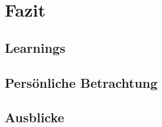 \section{Fazit}

    \subsection{Learnings}

    \subsection{Persönliche Betrachtung}

    \subsection{Ausblicke}
